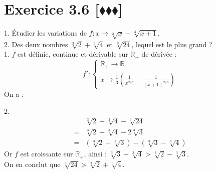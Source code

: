 \documentclass[10pt]{article}
\begin{document}
\section*{Exercice 3.6 [$\blacklozenge\blacklozenge\blacklozenge$]}
\begin{tcolorbox}[enhanced, width=6in, center, size=fbox, fontupper=\large, drop shadow southwest]
    1. Étudier les variations de $f:x\mapsto\sqrt[3]{x}-\sqrt[3]{x+1}$.\\
    2. Des deux nombres $\sqrt[3]{2}+\sqrt[3]{4}$ et $\sqrt[3]{24}$, lequel est le plus grand ?\\[0.5cm]
    1. $f$ est définie, continue et dérivable sur $\mathbb{R}_+$ de dérivée :
    \begin{equation*}
        f':\begin{cases}\mathbb{R}_+\rightarrow\mathbb{R}\\x\mapsto \frac{1}{3}\left(\frac{1}{x^{2/3}}-\frac{1}{(x+1)^{2/3}}\right)\end{cases}
    \end{equation*}
    On a :
    \begin{center}
    \end{center}
    2. 
    \begin{align*}
        &\sqrt[3]{2}+\sqrt[3]{4}-\sqrt[3]{24}\\
        =&\sqrt[3]{2}+\sqrt[3]{4}-2\sqrt[3]{3}\\
        =&(\sqrt[3]{2}-\sqrt[3]{3})-(\sqrt[3]{3}-\sqrt[3]{4})
    \end{align*}
    Or $f$ est croissante sur $\mathbb{R}_+$, ainsi : $\sqrt[3]{3}-\sqrt[3]{4}>\sqrt[3]{2}-\sqrt[3]{3}$.\\
    On en conclut que $\sqrt[3]{24}>\sqrt[3]{2}+\sqrt[3]{4} $.
\end{tcolorbox}

\end{document}
